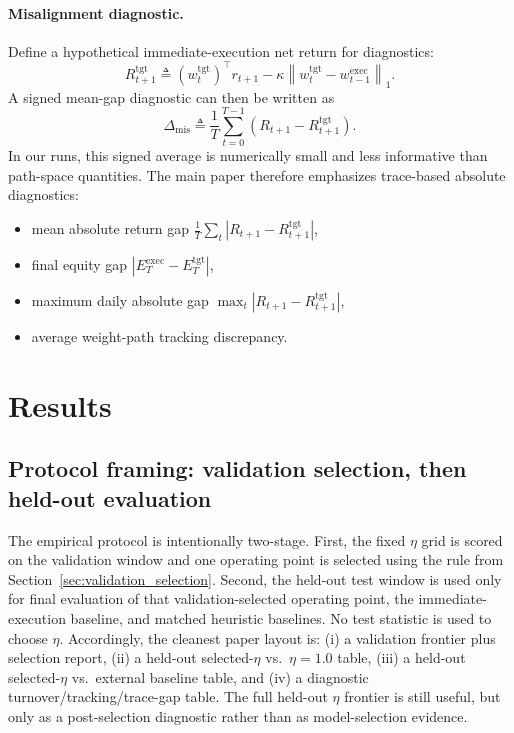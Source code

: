 \documentclass[10pt,twocolumn]{article}
\newcommand{\wexec}{w^{\mathrm{exec}}}
\newcommand{\wtgt}{w^{\mathrm{tgt}}}
\newcommand{\kappaTC}{\kappa}
\newcommand{\normone}[1]{\left\lVert #1 \right\rVert_1}
\begin{document}
\paragraph{Misalignment diagnostic.}
Define a hypothetical immediate-execution net return for diagnostics:
\[
R^{\mathrm{tgt}}_{t+1} \triangleq (\wtgt_t)^\top r_{t+1} - \kappaTC \normone{\wtgt_t-\wexec_{t-1}}.
\]
A signed mean-gap diagnostic can then be written as
\[
\Delta_{\mathrm{mis}} \triangleq \frac{1}{T}\sum_{t=0}^{T-1}\left(R_{t+1} - R^{\mathrm{tgt}}_{t+1}\right).
\]
In our runs, this signed average is numerically small and less informative than path-space quantities. The main paper therefore emphasizes trace-based absolute diagnostics:
\begin{itemize}[leftmargin=*,itemsep=1pt]
\item mean absolute return gap $\frac{1}{T}\sum_t |R_{t+1}-R^{\mathrm{tgt}}_{t+1}|$,
\item final equity gap $|E_T^{\mathrm{exec}}-E_T^{\mathrm{tgt}}|$,
\item maximum daily absolute gap $\max_t |R_{t+1}-R^{\mathrm{tgt}}_{t+1}|$,
\item average weight-path tracking discrepancy.
\end{itemize}

\section{Results}
\label{sec:results}

\subsection{Protocol framing: validation selection, then held-out evaluation}
The empirical protocol is intentionally two-stage. First, the fixed $\eta$ grid is scored on the validation window and one operating point is selected using the rule from Section~\ref{sec:validation_selection}. Second, the held-out test window is used only for final evaluation of that validation-selected operating point, the immediate-execution baseline, and matched heuristic baselines. No test statistic is used to choose $\eta$. Accordingly, the cleanest paper layout is: (i) a validation frontier plus selection report, (ii) a held-out selected-$\eta$ vs.\ $\eta=1.0$ table, (iii) a held-out selected-$\eta$ vs.\ external baseline table, and (iv) a diagnostic turnover/tracking/trace-gap table. The full held-out $\eta$ frontier is still useful, but only as a post-selection diagnostic rather than as model-selection evidence.
\end{document}
